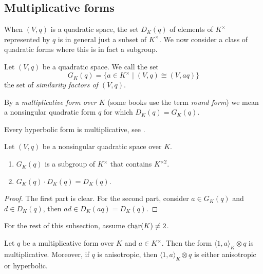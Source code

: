 \documentclass[12pt, leqno, british]{amsart}
\begin{document}
\subsection{Multiplicative forms}
When $(V, q)$ is a quadratic space, the set $D_K(q)$ of elements of $K^\times$ represented by $q$ is in general just a subset of $K^\times$.
We now consider a class of quadratic forms where this is in fact a subgroup.
\begin{defi}
Let $(V, q)$ be a quadratic space.
We call the set
$$ G_K(q) = \lbrace a \in K^\times \mid (V, q) \cong (V, aq) \rbrace $$
the set of \emph{similarity factors of $(V, q)$}.

By a \emph{multiplicative form over $K$} (some books use the term \emph{round form}) we mean a nonsingular quadratic form $q$ for which $D_K(q) = G_K(q)$.
\end{defi}
\begin{eg}
Every hyperbolic form is multiplicative, see .
\end{eg}
\begin{prop}\label{P:GKq-properties}
Let $(V, q)$ be a nonsingular quadratic space over $K$.
\begin{enumerate}
\item $G_K(q)$ is a subgroup of $K^\times$ that contains $K^{\times 2}$.
\item $G_K(q) \cdot D_K(q) = D_K(q)$.
\end{enumerate}
\end{prop}
\begin{proof}
The first part is clear.
For the second part, consider $a \in G_K(q)$ and $d \in D_K(q)$, then $ad \in D_K(aq) = D_K(q)$.
\end{proof}
For the rest of this subsection, assume $\operatorname{char}(K) \neq 2$.
\begin{thm}[Witt]\label{T:Witt-multiplicative-forms}
Let $q$ be a multiplicative form over $K$ and $a \in K^\times$.
Then the form $\langle 1, a \rangle_K \otimes q$ is multiplicative.
Moreover, if $q$ is anisotropic, then $\langle 1, a \rangle_K \otimes q$ is either anisotropic or hyperbolic.
\end{thm}
\end{document}
